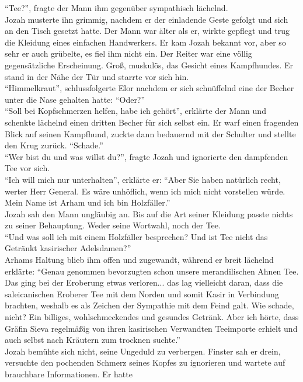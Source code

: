 ``Tee?'', fragte der Mann ihm gegenüber sympathisch lächelnd.\\
Jozah musterte ihn grimmig, nachdem er der einladende Geste gefolgt und sich an den Tisch gesetzt 
hatte. Der Mann war älter als er, wirkte gepflegt und trug die Kleidung eines einfachen 
Handwerkers. Er kam Jozah bekannt vor, aber so sehr er auch grübelte, es fiel ihm nicht ein. Der 
Reiter war eine völlig gegensätzliche Erscheinung. Groß, muskulös, das Gesicht eines Kampfhundes. 
Er stand in der Nähe der Tür und starrte vor sich hin.\\
``Himmelkraut'', schlussfolgerte Elor nachdem er sich schnüffelnd eine der Becher unter die Nase 
gehalten hatte: ``Oder?''\\
``Soll bei Kopfschmerzen helfen, habe ich gehört'', erklärte der Mann und schenkte lächelnd einen 
dritten Becher für sich selbst ein. Er warf einen fragenden Blick auf seinen Kampfhund, zuckte dann 
bedauernd mit der Schulter und stellte den Krug zurück. ``Schade.''\\
``Wer bist du und was willst du?'', fragte Jozah und ignorierte den dampfenden Tee vor sich.\\
``Ich will mich nur unterhalten'', erklärte er: ``Aber Sie haben natürlich recht, werter Herr 
General. Es wäre unhöflich, wenn ich mich nicht vorstellen würde. Mein Name ist Arham und ich bin 
Holzfäller.''\\
Jozah sah den Mann ungläubig an. Bis auf die Art seiner Kleidung passte nichts zu seiner 
Behauptung. Weder seine Wortwahl, noch der Tee.\\
``Und was soll ich mit einem Holzfäller besprechen? Und ist Tee nicht das Getränkt kasirischer 
Adelsdamen?''\\
Arhams Haltung blieb ihm offen und zugewandt, während er breit lächelnd erklärte: ``Genau genommen 
bevorzugten schon unsere merandilischen Ahnen Tee. Das ging bei der Eroberung etwas verloren... das 
lag vielleicht daran, dass die saleicanischen Eroberer Tee mit dem Norden und somit Kasir in 
Verbindung brachten, weshalb es als Zeichen der Sympathie mit dem Feind galt. Wie schade, nicht? 
Ein billiges, wohlschmeckendes und gesundes Getränk. Aber ich hörte, dass Gräfin Sieva regelmäßig 
von ihren kasirischen Verwandten Teeimporte erhielt und auch selbst nach Kräutern zum trocknen 
suchte.''\\
Jozah bemühte sich nicht, seine Ungeduld zu verbergen. Finster sah er drein, versuchte den 
pochenden Schmerz seines Kopfes zu ignorieren und wartete auf brauchbare Informationen. Er hatte 
